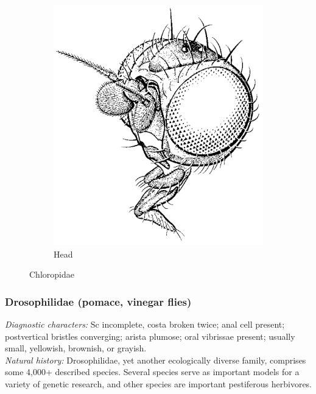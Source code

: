 \documentclass[letterpaper, 11pt]{article}
\begin{document}
\begin{figure}[ht!]
\begin{subfigure}[ht!]{0.25\textwidth}
        \includegraphics[width=\textwidth]{ChloropidHead}
        \caption{Head \citep[][Fig. 99.3]{mcalpine1981manualv2}}
        \label{fig:chloropid2}
    \end{subfigure}
    \caption{Chloropidae}\label{fig:chloropids}
\end{figure}

\subsubsection{Drosophilidae (pomace, vinegar flies)}
\noindent{}\textit{Diagnostic characters:} Sc incomplete, costa broken twice; anal cell present; postvertical bristles converging; arista plumose; oral vibrissae present; usually small, yellowish, brownish, or grayish.\\

\noindent{}\textit{Natural history:} Drosophilidae, yet another ecologically diverse family, comprises some 4,000+ described species. Several species serve as important models for a variety of genetic research, and other species are important pestiferous herbivores.
\end{document}

